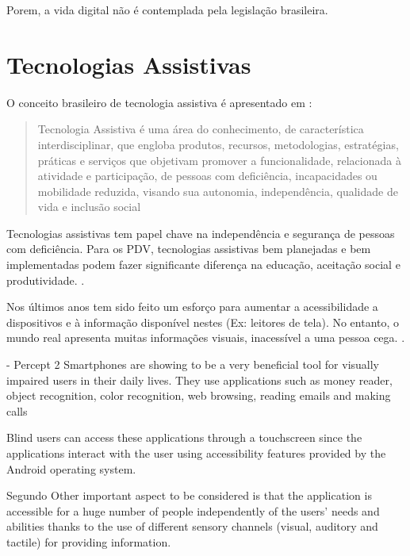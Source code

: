 \documentclass[english,brazilian]{UNISINOSmonografia}
\begin{document}
Porem, a vida digital não é contemplada pela legislação brasileira.




	\section{Tecnologias Assistivas}
O conceito brasileiro de tecnologia assistiva é apresentado em \cite{TA2009}:
\begin{quote}
	Tecnologia Assistiva é uma área do conhecimento, de característica interdisciplinar, que
	engloba produtos, recursos, metodologias, estratégias, práticas e serviços que objetivam promover
	a funcionalidade, relacionada à atividade e participação, de pessoas com deficiência,
	incapacidades ou mobilidade reduzida, visando sua autonomia, independência, qualidade de vida e
	inclusão social
\end{quote}



Tecnologias assistivas tem papel chave na independência e segurança de pessoas com deficiência. Para os PDV, tecnologias assistivas bem planejadas e bem implementadas podem fazer significante diferença na educação, aceitação social e produtividade. \cite{dias2015navpal}.

Nos últimos anos tem sido feito um esforço para aumentar a acessibilidade a dispositivos e à informação disponível nestes (Ex: leitores de tela). No entanto, o mundo real apresenta muitas informações visuais, inacessível a uma pessoa cega. \cite{ucat2014}.



- Percept 2
Smartphones are showing to be a very beneficial tool for visually impaired users in their daily lives. They use
applications such as money reader, object recognition, color recognition, web browsing, reading emails and making calls

Blind users can access these applications through a touchscreen since the applications interact with the user
using accessibility features provided by the Android  operating system. 




Segundo  Other important aspect to be considered is that the application is accessible for a huge number of people independently of the users’ needs and abilities thanks to the use of different sensory channels (visual, auditory and tactile) for providing information. 
\end{document}
